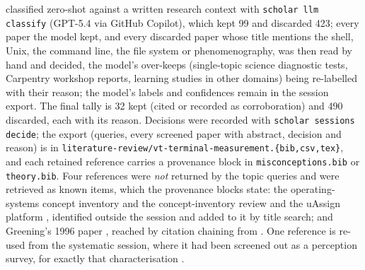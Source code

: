 classified zero-shot against a written research context with
\texttt{scholar llm classify} (GPT-5.4 via GitHub Copilot), which kept 99
and discarded 423; every paper the model kept, and every discarded paper
whose title mentions the shell, Unix, the command line, the file system or
phenomenography, was then read by hand and decided, the model's over-keeps
(single-topic science diagnostic tests, Carpentry workshop reports,
learning studies in other domains) being re-labelled with their reason;
the model's labels and confidences remain in the session export.
The final tally is 32 kept (cited or recorded as corroboration) and 490
discarded, each with its reason.
Decisions were recorded with \texttt{scholar sessions decide}; the export
(queries, every screened paper with abstract, decision and reason) is in
\texttt{literature-review/vt-terminal-measurement.\{bib,csv,tex\}}, and each
retained reference carries a provenance block in
\texttt{misconceptions.bib} or \texttt{theory.bib}.
Four references were \emph{not} returned by the topic queries and were
retrieved as known items, which the provenance blocks state: the
operating-systems concept inventory and the concept-inventory review
\autocite{WebbTaylor2014OSCI,Taylor2014CI} and the uAssign platform
\autocite{BaileyZilles2019uAssign}, identified outside the session and
added to it by title search; and Greening's 1996 paper
\autocite{Greening1996Unix}, reached by citation chaining from
\textcite{DoyleLister2006Unix}.
One reference is re-used from the systematic session, where it had been
screened out as a perception survey, for exactly that characterisation
\autocite{Buxton2024Perception}.

